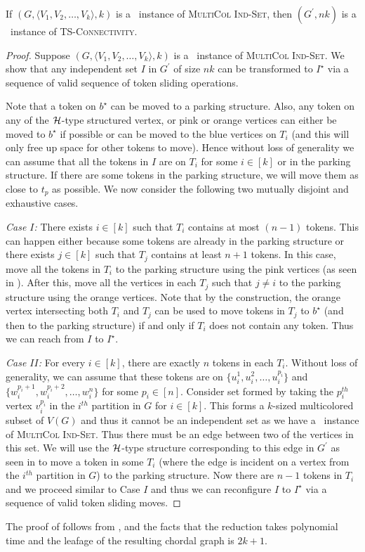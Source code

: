 \begin{lemma}
\label{lemma:backward-reduction-leafage}
If $(G,\langle V_1,V_2,\ldots,V_k\rangle, k)$ is a \no\ instance of \textsc{MultiCol Ind-Set},
then $(G^\prime,nk)$ is a \yes\ instance of \textsc{TS-Connectivity}.
\end{lemma}
\begin{proof}
Suppose $(G,\langle V_1,V_2,\ldots,V_k\rangle, k)$ is a \no\ 
instance of \textsc{MultiCol Ind-Set}. 
We show that any independent set $I$ in $G^\prime$
of size $nk$ can be transformed to $I^\star$ via a 
sequence of valid sequence of token sliding operations. 

Note that a token on $b^{\star}$ can be moved to a parking structure.
Also, any token on any of the ${\mathcal H}$-type structured vertex, or pink
or orange vertices can either be moved to $b^{\star}$ if possible or
can be moved to the blue vertices on $T_i$ 
(and this will only free up space for other tokens to move). 
Hence without loss of generality we can assume that all the tokens in $I$ are 
on $T_i$ for some $i\in[k]$ or in the parking structure. 
If there are some tokens in the parking structure, 
we will move them as close to $t_p$ as possible.
We now consider the following two mutually disjoint 
and exhaustive cases.

\emph{Case $I$:} There exists $i\in [k]$ such that $T_i$ contains 
at most $(n-1)$ tokens. 
This can happen either because some tokens are already in the parking 
structure or there exists $j\in [k]$ such that $T_j$ 
contains at least $n+1$ tokens. 
In this case, move all the tokens in $T_i$ to the parking structure 
using the pink vertices (as seen in \Cref{cl:lessthann}). 
After this, move all the vertices in each $T_j$ such that 
$j\neq i$ to the parking structure using the orange vertices.
Note that by the construction, the orange vertex intersecting both 
$T_i$ and $T_j$ can be used to move tokens in $T_j$ to $b^{\star}$
(and then to the parking structure) if and only if 
$T_i$ does not contain any token.
Thus we can reach from $I$ to $I^\star$.

\emph{Case $II$:} For every $i\in [k]$, 
there are exactly $n$ tokens in each $T_i$. 
Without loss of generality, we can assume that these 
tokens are on $\{u_i^1,u_i^2,\ldots,u_i^{p_i}\}$ and 
$\{w_i^{p_i+1},w_i^{p_i+2},\ldots,w_i^n\}$ for some $p_i\in[n]$.
Consider set formed by taking the $p_i^{th}$ vertex $v_i^{p_i}$
in the $i^{th}$ partition in $G$ for $i\in [k]$. 
This forms a $k$-sized multicolored subset of $V(G)$ 
and thus it cannot be an independent set as we 
have a \no\ instance of \textsc{MultiCol Ind-Set}.
Thus there must be an edge between two of the vertices in this set.
We will use the ${\mathcal H}$-type structure corresponding to 
this edge in $G^\prime$ as seen in  
to move a token in some $T_i$ 
(where the edge is incident on a vertex from the $i^{th}$ partition in $G$) 
to the parking structure. 
Now there are $n-1$ tokens in $T_i$ and we proceed similar to 
Case $I$ and thus we can reconfigure $I$ to $I^\star$ 
via a sequence of valid token sliding moves.
\end{proof}
The proof of  follows
from ,
 and the facts
that the reduction takes polynomial time and the leafage of
the resulting chordal graph is $2k + 1$.